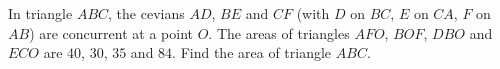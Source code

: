 In triangle $ABC$, the cevians $AD$, $BE$ and $CF$ (with $D$ on $BC$, $E$ on $CA$, $F$ on $AB$) are concurrent at a point $O$. The areas of triangles $AFO$, $BOF$, $DBO$ and $ECO$ are $40$, $30$, $35$ and $84$. Find the area of triangle $ABC$.
